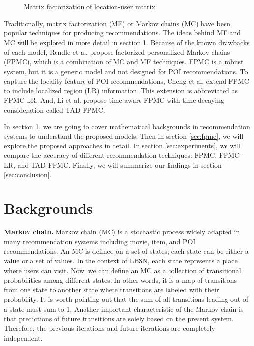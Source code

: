 \documentclass{sig-alternate}
\begin{document}
\begin{figure}
\centering
{}
\caption{Matrix factorization of location-user matrix}
\label{fig:MF}
\end{figure}

Traditionally, matrix factorization (MF) or Markov chains (MC) have been popular techniques for producing recommendations.
The ideas behind MF and MC will be explored in more detail in section \ref{sec:backgrounds}. 
Because of the known drawbacks of each model, Rendle et al. \cite{Rendle:2010:FPM} propose factorized personalized 
Markov chains (FPMC), which is a combination of MC and MF techniques. FPMC is a robust system, 
but it is a generic model and not designed for POI recommendations. To capture the locality feature of 
POI recommendations, Cheng et al. \cite{Cheng:2013} extend FPMC to include localized region (LR) information.  
This extension is abbreviated as FPMC-LR. 
And, Li et al. \cite{Li:2017} propose time-aware FPMC with time decaying consideration called TAD-FPMC.

In section \ref{sec:backgrounds}, we are going to cover mathematical backgrounds in recommendation systems 
to understand the proposed models. Then in section \ref{sec:fpmc}, we will explore the proposed approaches in detail. 
In section \ref{sec:experiments}, we will compare the accuracy of different recommendation techniques: FPMC, FPMC-LR, and TAD-FPMC. 
Finally, we will summarize our findings in section \ref{sec:conclusion}.



\section{Backgrounds}
\label{sec:backgrounds}


\textbf{Markov chain.} Markov chain (MC) is a stochastic process widely adapted in many recommendation systems 
including movie, item, and POI recommendations. An MC is defined on a set of states; each state can be either a value
or a set of values. In the context of LBSN, each state represents a place where users can visit.
Now, we can define an MC as a collection of transitional probabilities among different states.
In other words, it is a map of transitions from one state to another state where transitions are labeled with their probability.  
It is worth pointing out that the sum of all transitions leading out of a state must sum to 1. Another important 
characteristic of the Markov chain is that predictions of future transitions are solely based on the present 
system. Therefore, the previous iterations and future iterations are completely independent. 
\end{document}
